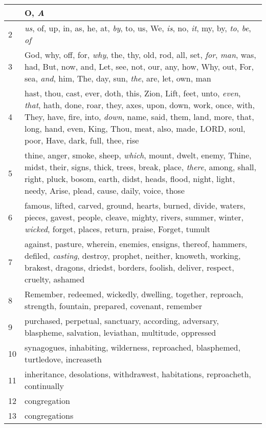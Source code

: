 \begin{longtable}{l|p{3.75in}}
\hline \hline
\endlastfoot
1 & O, \emph{A} \\ \hline
2 & \emph{us}, of, up, in, as, he, at, \emph{by}, to, us, We, \emph{is}, no, \emph{it}, my, by, \emph{to}, \emph{be}, \emph{of} \\ \hline
3 & God, why, off, for, \emph{why}, the, thy, old, rod, all, set, \emph{for}, \emph{man}, was, had, But, now, and, Let, see, not, our, any, how, Why, out, For, sea, \emph{and}, him, The, day, sun, \emph{the}, are, let, own, man \\ \hline
4 & hast, thou, cast, ever, doth, this, Zion, Lift, feet, unto, \emph{even}, \emph{that}, hath, done, roar, they, axes, upon, down, work, once, with, They, have, fire, into, \emph{down}, name, said, them, land, more, that, long, hand, even, King, Thou, meat, also, made, LORD, soul, poor, Have, dark, full, thee, rise \\ \hline
5 & thine, anger, smoke, sheep, \emph{which}, mount, dwelt, enemy, Thine, midst, their, signs, thick, trees, break, place, \emph{there}, among, shall, right, pluck, bosom, earth, didst, heads, flood, night, light, needy, Arise, plead, cause, daily, voice, those \\ \hline
6 & famous, lifted, carved, ground, hearts, burned, divide, waters, pieces, gavest, people, cleave, mighty, rivers, summer, winter, \emph{wicked}, forget, places, return, praise, Forget, tumult \\ \hline
7 & against, pasture, wherein, enemies, ensigns, thereof, hammers, defiled, \emph{casting}, destroy, prophet, neither, knoweth, working, brakest, dragons, driedst, borders, foolish, deliver, respect, cruelty, ashamed \\ \hline
8 & Remember, redeemed, wickedly, dwelling, together, reproach, strength, fountain, prepared, covenant, remember \\ \hline
9 & purchased, perpetual, sanctuary, according, adversary, blaspheme, salvation, leviathan, multitude, oppressed \\ \hline
10 & synagogues, inhabiting, wilderness, reproached, blasphemed, turtledove, increaseth \\ \hline
11 & inheritance, desolations, withdrawest, habitations, reproacheth, continually \\ \hline
12 & congregation \\ \hline
13 & congregations \\ \hline
\end{longtable}






